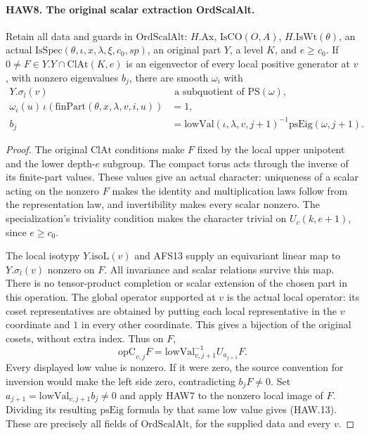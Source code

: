 \paragraph{HAW8. The original scalar extraction OrdScalAlt.}
\label{claim:HAW8}
Retain all data and guards in $\mathrm{OrdScalAlt}$:
$H.\mathrm{Ax}$, $\mathrm{IsCO}(O,A)$, $H.\mathrm{IsWt}(\theta)$,
an actual $\mathrm{IsSpec}(\theta,\iota,x,\lambda,\xi,c_0,sp)$,
an original part $Y$, a level $K$, and $e\ge c_0$.
If $0\ne F\in Y.Y\cap\mathrm{ClAt}(K,e)$ is an eigenvector
of every local positive generator at $v$, with nonzero
eigenvalues $b_j$, there are smooth $\omega_i$ with
\[
 \begin{split}
 Y.\sigma_l(v)&\text{ a subquotient of }\mathrm{PS}(\omega),\\
 \omega_i(u)\,\iota(\mathrm{finPart}(\theta,x,\lambda,v,i,u))&=1,\\
 b_j&=\mathrm{lowVal}(\iota,\lambda,v,j+1)^{-1}
                         \mathrm{psEig}(\omega,j+1).
 \end{split}
 \tag{HAW.13}
\]
\begin{proof}
The original $\mathrm{ClAt}$ conditions make $F$ fixed by
the local upper unipotent and the lower depth-$e$ subgroup.
The compact torus acts through the inverse of its finite-part
values.  These values give an actual character: uniqueness of
a scalar acting on the nonzero $F$ makes the identity and
multiplication laws follow from the representation law, and
invertibility makes every scalar nonzero.  The specialization's
triviality condition makes the character trivial on
$U_c(k,e+1)$, since $e\ge c_0$.

The local isotypy $Y.\mathrm{isoL}(v)$ and AFS13 supply an
equivariant linear map to $Y.\sigma_l(v)$ nonzero on $F$.
All invariance and scalar relations survive this map.  There
is no tensor-product completion or scalar extension of the
chosen part in this operation.  The global operator supported
at $v$ is the actual local operator: its coset representatives
are obtained by putting each local representative in the $v$
coordinate and $1$ in every other coordinate.  This gives
a bijection of the original cosets, without extra index.
Thus on $F$,
\[
 \mathrm{opC}_{v,j}F
       =\mathrm{lowVal}_{v,j+1}^{-1}U_{a_{j+1}}F.
\]
Every displayed low value is nonzero.  If it were zero, the
source convention for inversion would make the left side
zero, contradicting $b_jF\ne0$.  Set
$a_{j+1}=\mathrm{lowVal}_{v,j+1}b_j\ne0$ and apply HAW7 to
the nonzero local image of $F$.  Dividing its resulting
$\mathrm{psEig}$ formula by that same low value gives
(HAW.13).  These are precisely all fields of
$\mathrm{OrdScalAlt}$, for the supplied data and every $v$.
\end{proof}

